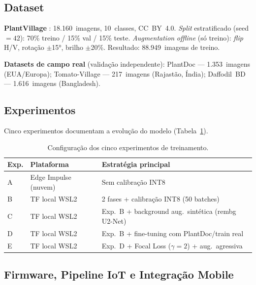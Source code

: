 \documentclass[12pt]{article}
\begin{document}
\subsection{Dataset}

\textbf{PlantVillage} \cite{hughes2015}: 18.160~imagens, 10~classes, CC~BY~4.0.
\textit{Split} estratificado (seed$=42$): 70\% treino / 15\% val / 15\% teste.
\textit{Augmentation} \textit{offline} (só treino): \textit{flip} H/V, rotação $\pm$15°, brilho $\pm$20\%.
Resultado: 88.949~imagens de treino.

\textbf{Datasets de campo real} (validação independente):
PlantDoc \cite{singh2020} --- 1.353~imagens (EUA/Europa);
Tomato-Village \cite{gehlot2023} --- 217~imagens (Rajastão, Índia);
Daffodil~BD~\cite{daffodilbd2024} --- 1.616~imagens (Bangladesh).

\subsection{Experimentos}

Cinco experimentos documentam a evolução do modelo (Tabela~\ref{tab:experimentos}).

\begin{table}[ht]
\centering
\caption{Configuração dos cinco experimentos de treinamento.}
\label{tab:experimentos}
\begin{tabular}{@{}llp{5.5cm}@{}}
\toprule
\textbf{Exp.} & \textbf{Plataforma} & \textbf{Estratégia principal} \\
\midrule
A & Edge Impulse (nuvem) & Sem calibração INT8 \\
B & TF local WSL2 & 2 fases + calibração INT8 (50 batches) \\
C & TF local WSL2 & Exp.~B + background aug.\ sintética (rembg U2-Net) \\
D & TF local WSL2 & Exp.~B + fine-tuning com PlantDoc/train real \\
E & TF local WSL2 & Exp.~D + Focal Loss ($\gamma=2$) + aug.\ agressiva \\
\bottomrule
\end{tabular}
\end{table}

\subsection{Firmware, Pipeline IoT e Integração Mobile}
\end{document}
